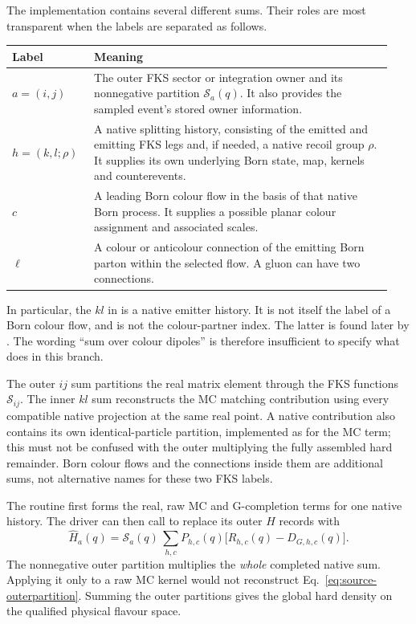 The implementation contains several different sums. Their roles are most
transparent when the labels are separated as follows.
\begin{center}
\small
\begin{tabular}{@{}p{0.20\linewidth}p{0.74\linewidth}@{}}
\toprule
Label & Meaning \\
\midrule
$a=(i,j)$ & The outer FKS sector or integration owner and its nonnegative
partition $\mathcal S_a(q)$. It also provides the sampled event's stored
owner information. \\
$h=(k,l;\rho)$ & A native splitting history, consisting of the emitted and
emitting FKS legs and, if needed, a native recoil group $\rho$. It supplies
its own underlying Born state, map, kernels and counterevents. \\
$c$ & A leading Born colour flow in the basis of that native Born process.
It supplies a possible planar colour assignment and associated scales. \\
$\ell$ & A colour or anticolour connection of the emitting Born parton
within the selected flow. A gluon can have two connections. \\
\bottomrule
\end{tabular}
\end{center}

In particular, the $kl$ in
 is a native
emitter history. It is not itself the label of a Born colour flow, and is
not the colour-partner index. The latter is found later by
. The wording ``sum over colour
dipoles'' is therefore insufficient to specify what
 does in this branch.

The outer $ij$ sum partitions the real matrix element through the FKS
functions $\mathcal S_{ij}$. The inner $kl$ sum reconstructs the MC matching
contribution using every compatible native projection at the same real
point. A native contribution also contains its own identical-particle
partition, implemented as  for the MC term; this
must not be confused with the outer  multiplying
the fully assembled hard remainder. Born colour flows and the connections
inside them are additional sums, not alternative names for these two FKS
labels.

The routine  first forms the
real, raw MC and G-completion terms for one native history. The driver can
then call  to replace its outer $H$
records with
\begin{equation}
 \widehat H_a(q)=\mathcal S_a(q)\,
       \sum_{h,c}P_{h,c}(q)
       \bigl[R_{h,c}(q)-D_{G,h,c}(q)\bigr].
 \label{eq:source-outerpartition}
\end{equation}
The nonnegative outer partition multiplies the \emph{whole} completed
native sum. Applying it only to a raw MC kernel would not reconstruct
Eq.~\eqref{eq:source-outerpartition}. Summing the outer partitions gives the
global hard density on the qualified physical flavour space.

